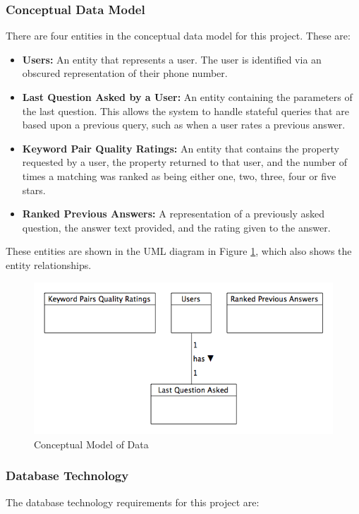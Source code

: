\documentclass[authoryearcitations]{UoYCSproject}
\begin{document}
\subsubsection{Conceptual Data Model}
There are four entities in the conceptual data model for this project.  These are:

\begin{itemize}
  \item {\bf Users:} An entity that represents a user. The user is identified via an obscured representation of their phone number.
  \item {\bf Last Question Asked by a User:} An entity containing the parameters of the last question.  This allows the system to handle stateful queries that are based upon a previous query, such as when a user rates a previous answer.
  \item {\bf Keyword Pair Quality Ratings:} An entity that contains the property requested by a user, the property returned to that user, and the number of times a matching was ranked as being either one, two, three, four or five stars.
  \item {\bf Ranked Previous Answers:} A representation of a previously asked question, the answer text provided, and the rating given to the answer.
\end{itemize}

These entities are shown in the UML diagram in Figure \ref{fig:conceptualDatabaseDesignDiagram}, which also shows the entity relationships.

\begin{figure}[htb] 
\centerline{\includegraphics[width=0.8\linewidth]{conceptualModel}}
\caption{Conceptual Model of Data}
\label{fig:conceptualDatabaseDesignDiagram}
\end{figure}

\subsubsection{Database Technology}
\label{subsubsec:databaseTechnology}
The database technology requirements for this project are:
\end{document}
